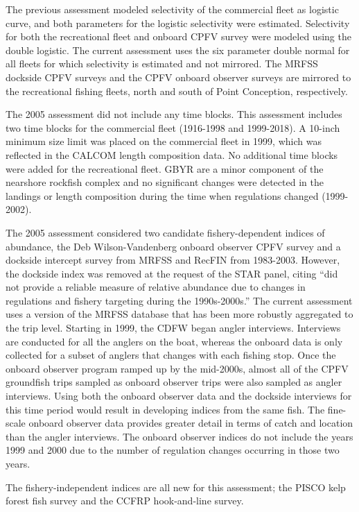 \documentclass[12pt,]{article}
\begin{document}
The previous assessment modeled selectivity of the commercial fleet as
logistic curve, and both parameters for the logistic selectivity were
estimated. Selectivity for both the recreational fleet and onboard CPFV
survey were modeled using the double logistic. The current assessment
uses the six parameter double normal for all fleets for which
selectivity is estimated and not mirrored. The MRFSS dockside CPFV
surveys and the CPFV onboard observer surveys are mirrored to the
recreational fishing fleets, north and south of Point Conception,
respectively.

The 2005 assessment did not include any time blocks. This assessment
includes two time blocks for the commercial fleet (1916-1998 and
1999-2018). A 10-inch minimum size limit was placed on the commercial
fleet in 1999, which was reflected in the CALCOM length composition
data. No additional time blocks were added for the recreational fleet.
GBYR are a minor component of the nearshore rockfish complex and no
significant changes were detected in the landings or length composition
during the time when regulations changed (1999-2002).

The 2005 assessment considered two candidate fishery-dependent indices
of abundance, the Deb Wilson-Vandenberg onboard observer CPFV survey and
a dockside intercept survey from MRFSS and RecFIN from 1983-2003.
However, the dockside index was removed at the request of the STAR
panel, citing ``did not provide a reliable measure of relative abundance
due to changes in regulations and fishery targeting during the
1990s-2000s.'' The current assessment uses a version of the MRFSS
database that has been more robustly aggregated to the trip level.
Starting in 1999, the CDFW began angler interviews. Interviews are
conducted for all the anglers on the boat, whereas the onboard data is
only collected for a subset of anglers that changes with each fishing
stop. Once the onboard observer program ramped up by the mid-2000s,
almost all of the CPFV groundfish trips sampled as onboard observer
trips were also sampled as angler interviews. Using both the onboard
observer data and the dockside interviews for this time period would
result in developing indices from the same fish. The fine-scale onboard
observer data provides greater detail in terms of catch and location
than the angler interviews. The onboard observer indices do not include
the years 1999 and 2000 due to the number of regulation changes
occurring in those two years.

The fishery-independent indices are all new for this assessment; the
PISCO kelp forest fish survey and the CCFRP hook-and-line survey.
\end{document}
